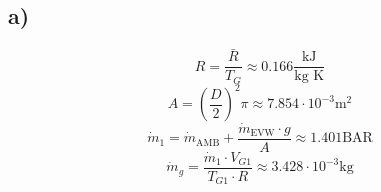 

\subsection*{a)}
\begin{equation*}
    R = \frac{\bar{R}}{T_G} \approx 0.166 \frac{\text{kJ}}{\text{kg K}}
\end{equation*}
\begin{equation*}
    A = \left(\frac{D}{2}\right)^2 \pi \approx 7.854 \cdot 10^{-3} \text{m}^2
\end{equation*}
\begin{equation*}
    \dot{m}_1 = \dot{m}_{\text{AMB}} + \frac{\dot{m}_{\text{EVW}} \cdot g}{A} \approx 1.401 \text{BAR}
\end{equation*}
\begin{equation*}
    \dot{m}_g = \frac{\dot{m}_1 \cdot V_{G1}}{T_{G1} \cdot R} \approx 3.428 \cdot 10^{-3} \text{kg}
\end{equation*}